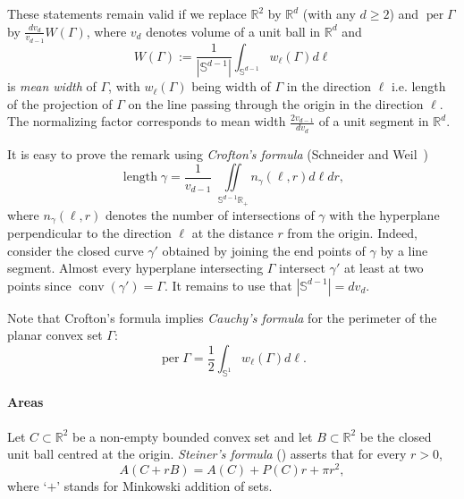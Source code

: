 \documentclass[AHL,Unicode,published]{cedram}
\DeclareMathOperator{\per}{per}
\DeclareMathOperator{\length}{length}
\DeclareMathOperator{\conv}{conv}
\newcommand{\Rbb}{\mathbb{R}}
\newcommand{\Sbb}{\mathbb{S}}
\begin{document}
\begin{rema}\label{rem: mean width}
These statements remain valid if we replace $\Rbb^2$ by $\Rbb^d$ (with any $d \ge 2$) and $\per \Gamma$ by $\tfrac{d v_d}{v_{d-1}} W(\Gamma)$, where $v_d$ denotes volume of a unit ball in $\Rbb^d$ and
\begin{equation}\label{eq: mean width}
W(\Gamma):= \frac{1}{|\Sbb^{d-1}|} \int_{\Sbb^{d-1}} w_\ell(\Gamma) d \ell
\end{equation}
is \emph{mean width} of $\Gamma$, with $w_\ell (\Gamma)$ being width of $\Gamma$ in the direction $\ell$ i.e. length of the projection of $\Gamma$ on the line passing through the origin in the direction $\ell$. The normalizing factor corresponds to mean width $\tfrac{2 v_{d-1}}{d v_d}$ of a unit segment in $\Rbb^d$.
\end{rema}

It is easy to prove the remark using {\it Crofton's formula} (Schneider and Weil~\cite[Eq.~(5.32)]{SchneiderWeil})
\[
\length \gamma = \frac{1}{v_{d-1}}\;\iint \limits_{\Sbb^{d-1} \Rbb_+}n_{\gamma}(\ell, r) d\ell dr,
\]
where $n_\gamma(\ell, r)$ denotes the number of intersections of $\gamma$ with the hyperplane perpendicular to the direction $\ell$ at the distance $r$ from the origin. Indeed, consider the closed curve $\gamma'$ obtained by joining the end points of $\gamma$ by a line segment. Almost every hyperplane intersecting $\Gamma$ intersect $\gamma'$ at least at two points since $\conv(\gamma')=\Gamma$. It remains to use that $|\Sbb^{d-1}| = d v_d$.

Note that Crofton's formula implies \emph{Cauchy's formula} for the perimeter of the planar convex set $\Gamma$:
\begin{equation}\label{eq: Cauchy}
\per \Gamma = \frac12 \int_{\Sbb^1} w_\ell(\Gamma) d\ell.
\end{equation}

\paragraph{Areas}
Let $C \subset \Rbb^2$ be a non-empty bounded convex set and let $B \subset \Rbb^2$ be the closed unit ball centred at the origin. \emph{Steiner's formula} (\cite[Eq.~(14.5)]{SchneiderWeil}) asserts that for every $r>0$,
\begin{equation}\label{eq: Steiner}
A(C+r B) = A(C) + P(C) r + \pi r^2,
\end{equation}
where `$+$' stands for Minkowski addition of sets.
\end{document}
